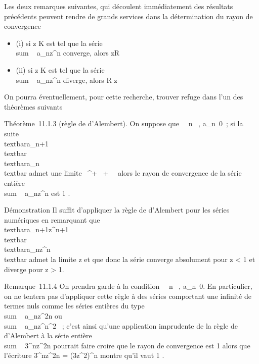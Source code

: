 \documentclass[]{article}
\begin{document}
Les deux remarques suivantes, qui découlent immédiatement des résultats
précédents peuvent rendre de grands services dans la détermination du
rayon de convergence

\begin{itemize}
\itemsep1pt\parskip0pt
\item
  (i) si z \in K est tel que la série
  \\sum ~
  a\_nz^n converge, alors \textbar{}z\textbar{}\leq R
\item
  (ii) si z \in K est tel que la série
  \\sum ~
  a\_nz^n diverge, alors R \leq\textbar{}z\textbar{}
\end{itemize}

On pourra éventuellement, pour cette recherche, trouver refuge dans l'un
des théorèmes suivants

Théorème~11.1.3 (règle de d'Alembert). On suppose que
\forall~~n \in {}~,
a\_n\neq~0~; si la suite 
\\textbar{}a\_n+1\\textbar{}
\over
\\textbar{}a\_n\\textbar{} admet
une limite \ell \in {}~^+ \cup\ + \infty~\,
alors le rayon de convergence de la série entière
\\sum ~
a\_nz^n est  1 \over \ell .

Démonstration Il suffit d'appliquer la règle de d'Alembert pour les
séries numériques en remarquant que 
\\textbar{}a\_n+1z^n+1\\textbar{}
\over
\\textbar{}a\_nz^n\\textbar{}
admet la limite \ell\textbar{}z\textbar{} et que donc la série converge
absolument pour \ell\textbar{}z\textbar{} \textless{} 1 et diverge pour
\ell\textbar{}z\textbar{} \textgreater{} 1.

Remarque~11.1.4 On prendra garde à la condition
\forall~~n \in {}~,
a\_n\neq~0. En particulier, on ne tentera
pas d'appliquer cette règle à des séries comportant une infinité de
termes nuls comme les séries entières du type
\\sum ~
a\_nz^2n ou
\\sum ~
a\_nz^n^2 ~; c'est ainsi qu'une
application imprudente de la règle de d'Alembert à la série entière
\\sum ~
3^nz^2n pourrait faire croire que le rayon de
convergence est  1  alors que l'écriture
\textbar{}3^nz^2n\textbar{} =
\left
(3\textbar{}z\textbar{}^2\right )^n
montre qu'il vaut  1 \over {}
.
\end{document}
